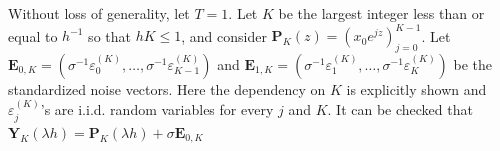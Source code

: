 \documentclass[final]{siamltex}
\begin{document}
\begin{appendices}

Without loss of generality, let $T=1$.
Let $K$ be the largest integer less than or equal to $h^{-1}$ so that $hK \le 1$,
and consider $\bm{P}_K(z)=(x_0e^{jz})_{j=0}^{K-1}$.
Let $\bm{E}_{0,K} = (\sigma^{-1}\varepsilon_0^{(K)},\dots,\sigma^{-1}\varepsilon_{K-1}^{(K)})$ and
$\bm{E}_{1,K} = (\sigma^{-1}\varepsilon_1^{(K)},\dots,\sigma^{-1}\varepsilon_K^{(K)})$
be the standardized noise vectors.
Here the dependency on $K$ is explicitly shown
and $\varepsilon_j^{(K)}$'s are i.i.d. random variables for every $j$ and $K$.
It can be checked that $\bm{Y}_K(\lambda h) = \bm{P}_K(\lambda h) + \sigma \bm{E}_{0,K}$



\end{appendices}
\end{document}
